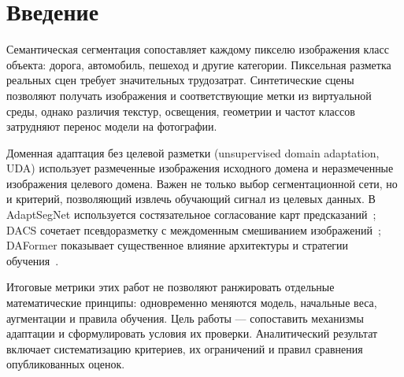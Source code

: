 \section{Введение}
Семантическая сегментация сопоставляет каждому пикселю изображения класс объекта: дорога, автомобиль, пешеход и другие категории. Пиксельная разметка реальных сцен требует значительных трудозатрат. Синтетические сцены позволяют получать изображения и соответствующие метки из виртуальной среды, однако различия текстур, освещения, геометрии и частот классов затрудняют перенос модели на фотографии.

Доменная адаптация без целевой разметки (unsupervised domain adaptation, UDA) использует размеченные изображения исходного домена и неразмеченные изображения целевого домена. Важен не только выбор сегментационной сети, но и критерий, позволяющий извлечь обучающий сигнал из целевых данных. В AdaptSegNet используется состязательное согласование карт предсказаний~\cite{tsai}; DACS сочетает псевдоразметку с междоменным смешиванием изображений~\cite{dacs}; DAFormer показывает существенное влияние архитектуры и стратегии обучения~\cite{daformer}.

Итоговые метрики этих работ не позволяют ранжировать отдельные математические принципы: одновременно меняются модель, начальные веса, аугментации и правила обучения. Цель работы --- сопоставить механизмы адаптации и сформулировать условия их проверки. Аналитический результат включает систематизацию критериев, их ограничений и правил сравнения опубликованных оценок.
